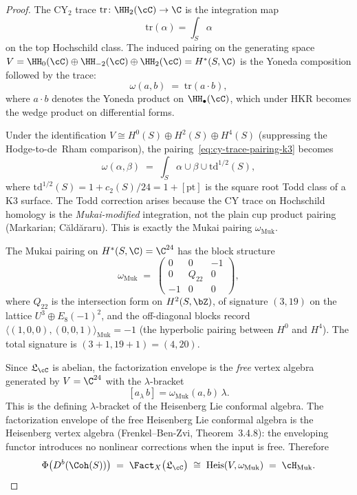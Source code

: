 \begin{proof}
The CY$_2$ trace $\mathrm{tr} \colon \HH_2(\cC) \to \C$ is the integration map
\[
 \mathrm{tr}(\alpha) = \int_S \alpha
\]
on the top Hochschild class. The induced pairing on the generating space $V = \HH_0(\cC) \oplus \HH_{-2}(\cC) \oplus \HH_2(\cC) = H^*(S, \C)$ is the Yoneda composition followed by the trace:
\begin{equation}\label{eq:cy-trace-pairing-k3}
 \omega(a, b) \;=\; \mathrm{tr}(a \cdot b),
\end{equation}
where $a \cdot b$ denotes the Yoneda product on $\HH_\bullet(\cC)$, which under HKR becomes the wedge product on differential forms.

Under the identification $V \cong H^0(S) \oplus H^2(S) \oplus H^4(S)$ (suppressing the Hodge-to-de~Rham comparison), the pairing~\eqref{eq:cy-trace-pairing-k3} becomes
\[
 \omega(\alpha, \beta) \;=\; \int_S \alpha \cup \beta \cup \mathrm{td}^{1/2}(S),
\]
where $\mathrm{td}^{1/2}(S) = 1 + c_2(S)/24 = 1 + [\mathrm{pt}]$ is the square root Todd class of a K3 surface. The Todd correction arises because the CY trace on Hochschild homology is the \emph{Mukai-modified} integration, not the plain cup product pairing (Markarian; C\u{a}ld\u{a}raru). This is exactly the Mukai pairing $\omega_{\mathrm{Muk}}$.

The Mukai pairing on $H^*(S, \C) = \C^{24}$ has the block structure
\[
 \omega_{\mathrm{Muk}} \;=\; \begin{pmatrix}
 0 & 0 & -1 \\
 0 & Q_{22} & 0 \\
 -1 & 0 & 0
 \end{pmatrix},
\]
where $Q_{22}$ is the intersection form on $H^2(S, \bZ)$, of signature $(3, 19)$ on the lattice $U^3 \oplus E_8(-1)^2$, and the off-diagonal blocks record $\langle (1, 0, 0), (0, 0, 1) \rangle_{\mathrm{Muk}} = -1$ (the hyperbolic pairing between $H^0$ and $H^4$). The total signature is $(3 + 1, 19 + 1) = (4, 20)$.

\smallskip
Since $\mathfrak{L}_\cC$ is abelian, the factorization envelope is the \emph{free} vertex algebra generated by $V = \C^{24}$ with the $\lambda$-bracket
\[
 [a_\lambda\, b] = \omega_{\mathrm{Muk}}(a, b) \, \lambda.
\]
This is the defining $\lambda$-bracket of the Heisenberg Lie conformal algebra. The factorization envelope of the free Heisenberg Lie conformal algebra is the Heisenberg vertex algebra (Frenkel--Ben-Zvi, Theorem~3.4.8): the enveloping functor introduces no nonlinear corrections when the input is free. Therefore
\[
 \Phi\bigl(D^b(\Coh(S))\bigr) \;=\; \Fact_X\bigl(\mathfrak{L}_\cC\bigr) \;\cong\; \mathrm{Heis}(V, \omega_{\mathrm{Muk}}) \;=\; \cH_{\mathrm{Muk}}.
\]


\end{proof}
